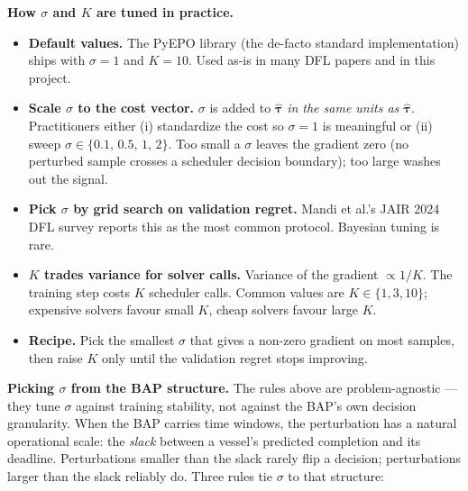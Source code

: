 \documentclass[11pt]{article}
\begin{document}
\noindent
\textbf{How $\sigma$ and $K$ are tuned in practice.}
\begin{itemize}\setlength{\itemsep}{0pt}
  \item \textbf{Default values.} The PyEPO library (the de-facto
        standard implementation) ships with $\sigma{=}1$ and $K{=}10$.
        Used as-is in many DFL papers and in this project.
  \item \textbf{Scale $\sigma$ to the cost vector.} $\sigma$ is added
        to $\hat{\boldsymbol{\tau}}$ \emph{in the same units as
        $\hat{\boldsymbol{\tau}}$}. Practitioners either (i)
        standardize the cost so $\sigma{=}1$ is meaningful or (ii)
        sweep $\sigma \in \{0.1,\,0.5,\,1,\,2\}$. Too small a $\sigma$
        leaves the gradient zero (no perturbed sample crosses a
        scheduler decision boundary); too large washes out the signal.
  \item \textbf{Pick $\sigma$ by grid search on validation regret.}
        Mandi et al.'s JAIR 2024 DFL survey reports this as the most
        common protocol. Bayesian tuning is rare.
  \item \textbf{$K$ trades variance for solver calls.} Variance of the
        gradient $\propto 1/K$. The training step costs $K$ scheduler
        calls. Common values are $K \in \{1,3,10\}$; expensive solvers
        favour small $K$, cheap solvers favour large $K$.
  \item \textbf{Recipe.} Pick the smallest $\sigma$ that gives a
        non-zero gradient on most samples, then raise $K$ only until
        the validation regret stops improving.
\end{itemize}

\vspace{0.4em}

\noindent
\textbf{Picking $\sigma$ from the BAP structure.}
The rules above are problem-agnostic --- they tune $\sigma$ against
training stability, not against the BAP's own decision granularity.
When the BAP carries time windows, the perturbation has a natural
operational scale: the \emph{slack} between a vessel's predicted
completion and its deadline. Perturbations smaller than the slack
rarely flip a decision; perturbations larger than the slack reliably
do. Three rules tie $\sigma$ to that structure:
\end{document}
